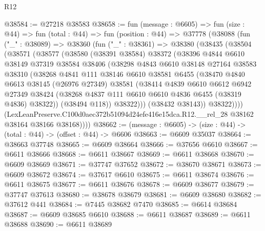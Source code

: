 \begin{lexlean}{R12}
\begin{coremodule}
@38584 := @27218 @38583
@38658 := fun (message : @6605) =>
  fun (size : @44) =>
  fun (total : @44) =>
  fun (position : @44) =>
  @37778
    (@38088
      (fun ("_" : @38089) =>
      @38360
        (fun ("_" : @38361) =>
        @38380
          (@38435
            (@38504
              (@38571
                (@38577
                  (@38580
                    (@38391 @38584)
                    @38372
                    (@38396
                      @4844
                      @6610
                      @38149
                      @37319
                      @38584
                      @38406
                      (@38298
                        @4843
                        @6610
                        @38148
                        @27164
                        @38583
                        @38310
                        (@38268
                          @4841
                          @111
                          @38146
                          @6610
                          @38581
                          @6455
                          (@38470
                            @4840
                            @6613
                            @38145
                            (@26976 @27349)
                            @38581
                            (@38414
                              @4839
                              @6610
                              @6612
                              @6942
                              @27349
                              @38424
                              (@38268 @4837 @111 @6610 @6610 @4836 @6455 (@38319 @4836) @38322))
                            (@38494 @118))
                          @38322)))
                    (@38432 @38143))
                  @38322))))
          (LexLeanPreserve.C100d0aec372b51094d24efe416e15dca.R12.__rel_28
            @38162
            @38164
            @38166
            @38168))))
@38662 := (message : @6605) -> (size : @44) -> (total : @44) -> (offset : @44) -> @6606
@38663 := @6609 @35037
@38664 := @38663 @37748
@38665 := @6609 @38664
@38666 := @37656 @6610
@38667 := @6611 @38666
@38668 := @6611 @38667
@38669 := @6611 @38668
@38670 := @6609 @38669
@38671 := @37747 @37652
@38672 := @38670 @38671
@38673 := @6609 @38672
@38674 := @37617 @6610
@38675 := @6611 @38674
@38676 := @6611 @38675
@38677 := @6611 @38676
@38678 := @6609 @38677
@38679 := @37747 @37613
@38680 := @38678 @38679
@38681 := @6609 @38680
@38682 := @37612 @441
@38684 := @7445 @38682 @7470
@38685 := @6614 @38684
@38687 := @6609 @38685 @6610
@38688 := @6611 @38687
@38689 := @6611 @38688
@38690 := @6611 @38689

\end{coremodule}
\end{lexlean}
